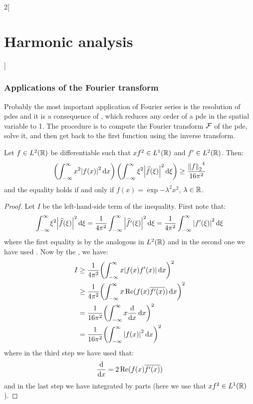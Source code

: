 \documentclass[../../../main_math.tex]{subfiles}
\begin{document}
\begin{multicols}{2}[\section{Harmonic analysis}]
  \subsubsection{Applications of the Fourier transform}
  \begin{remark}
    Probably the most important application of Fourier series is the resolution of pdes and it is a consequence of , which reduces any order of a pde in the spatial variable to 1. The procedure is to compute the Fourier transform $\mathcal{F}$ of the pde, solve it, and then get back to the first function using the inverse transform.
  \end{remark}
  \begin{theorem}
    Let $f\in L^2(\mathbb{R})$ be differentiable such that $xf^2\in L^1(\mathbb{R})$ and $f'\in L^2(\mathbb{R})$. Then:
    $$\left(\int_{-\infty}^\infty x^2 \abs{f(x)}^2\dd{x}\right)\left(\int_{-\infty}^\infty \xi^2 \abs{\widehat{f}(\xi)}^2\dd{\xi}\right)\geq \frac{{\left\|f\right\|_2}^4}{16\pi^2}$$
    and the equality holds if and only if $f(x)=\exp{-\lambda^2x^2}$, $\lambda\in\mathbb{R}$.
  \end{theorem}
  \begin{proof}
    Let $I$ be the left-hand-side term of the inequality. First note that:
    $$\int_{-\infty}^\infty \!\xi^2 \abs{\widehat{f}(\xi)}^2\dd{\xi}=\frac{1}{4\pi^2}\int_{-\infty}^\infty \abs{\widehat{f'}(\xi)}^2\dd{\xi}=\frac{1}{4\pi^2}\int_{-\infty}^\infty \abs{{f'}(\xi)}^2\dd{\xi}$$
    where the first equality is by the analogous  in $L^2(\mathbb{R})$ and in the second one we have used .
    Now by the , we have:
    \begin{align*}
      I & \geq \frac{1}{4\pi^2}{\left(\int_{-\infty}^\infty x\abs{f(x){f'}(x)}\dd{x}\right)}^2         \\
        & \geq \frac{1}{4\pi^2}{\left(\int_{-\infty}^\infty x\Re(f(x)\overline{f'(x)})\dd{x}\right)}^2 \\
        & = \frac{1}{16\pi^2}{\left(\int_{-\infty}^\infty x\dv{}{x}(\abs{f(x)}^2)\dd{x}\right)}^2      \\
        & = \frac{1}{16\pi^2}{\left(\int_{-\infty}^\infty \abs{f(x)}^2\dd{x}\right)}^2                 \\
    \end{align*}
    where in the third step we have used that:
    $$\dv{}{x}(\abs{f(x)}^2)=2\Re(f(x)\overline{f'(x)})$$
    and in the last step we have integrated by parts (here we use that $xf^2\in L^1(\mathbb{R})$).

\end{proof}
\end{multicols}
\end{document}
